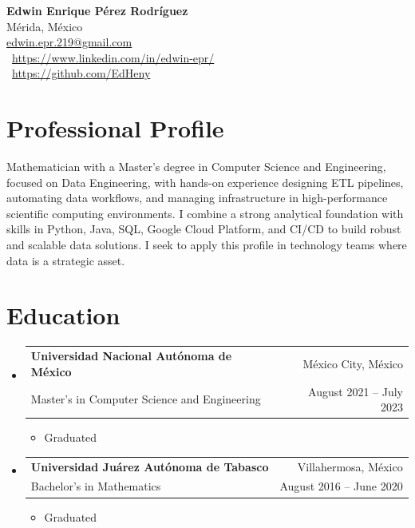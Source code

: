 \documentclass[10pt, letterpaper]{article}
\makeatletter
\newcommand{\CVName}[1]{\textbf{\Large #1} \\[3mm]}
\newcommand{\CVLocation}[1]{{\footnotesize \faMapMarked*} #1 \\}
\newcommand{\CVEmail}[1]{{\footnotesize \faEnvelope[regular] } \href{mailto:#1}{#1} \\}
\newcommand{\CVLinkedin}[1]{{\footnotesize \faLinkedin}\ \url{#1} \\}
\newcommand{\CVGithub}[1]{{\footnotesize \faGithub}\ \url{#1} \\}
\newcommand{\CVitem}[1]{
	\item \small{#1}
}
\newcommand{\CVListStart}{\begin{itemize}[leftmargin=0cm, label={}]}
\newcommand{\CVListEnd}{\end{itemize}}
\newcommand{\CVSubHeading}[4]{
	\item \begin{tabular*}{19.5cm}[t]{l@{\extracolsep{\fill}}r}
		\textbf{#1} & #2 \\
		\small #3 & \small #4 \\
	\end{tabular*} \vspace{-4pt}
}
\newcommand{\CVItemizeStart}{\begin{itemize}[rightmargin=1cm, label={\tiny \textbullet}]}
\newcommand{\CVItemizeEnd}{\end{itemize}}
\makeatother
\begin{document}
\begin{center}
	\begin{minipage}[c]{10cm}
		\center
		\CVName{Edwin Enrique Pérez Rodríguez}
		\CVLocation{Mérida, México}
		\CVEmail{edwin.epr.219@gmail.com}
		\CVLinkedin{https://www.linkedin.com/in/edwin-epr/}
		\CVGithub{https://github.com/EdHeny}
	\end{minipage}
\end{center}

\section*{Professional Profile}
Mathematician with a Master's degree in Computer Science and Engineering, focused on Data Engineering, with hands-on experience designing ETL pipelines, automating data workflows, and managing infrastructure in high-performance scientific computing environments. I combine a strong analytical foundation with skills in Python, Java, SQL, Google Cloud Platform, and CI/CD to build robust and scalable data solutions. I seek to apply this profile in technology teams where data is a strategic asset.
\section{Education}
\CVListStart
\CVSubHeading{Universidad Nacional Autónoma de México}{México City, México}{Master's in Computer Science and Engineering}{August 2021 -- July 2023}
\CVItemizeStart
\CVitem{Graduated}
\CVItemizeEnd
\CVSubHeading{Universidad Juárez Autónoma de Tabasco}{Villahermosa, México}{Bachelor's in Mathematics}{August 2016 -- June 2020}
\CVItemizeStart
\CVitem{Graduated}
\CVItemizeEnd
\CVListEnd
\end{document}
